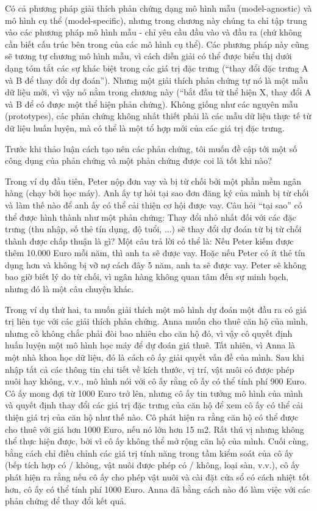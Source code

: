 Có cả phương pháp giải thích phản chứng dạng mô hình mẫu (model-agnostic) và mô hình cụ thể (model-specific), nhưng trong chương này chúng ta chỉ tập trung vào các phương pháp mô hình mẫu - chỉ yêu cầu đầu vào và đầu ra (chứ không cần biết cấu trúc bên trong của các mô hình cụ thể). Các phương pháp này cũng sẽ tương tự chương mô hình mẫu, vì cách diễn giải có thể được biểu thị dưới dạng tóm tắt các sự khác biệt trong các giá trị đặc trưng (``thay đổi đặc trưng A và B để thay đổi dự đoán''). Nhưng một giải thích phản chứng tự nó là một mẫu dữ liệu mới, vì vậy nó nằm trong chương này (``bắt đầu từ thể hiện X, thay đổi A và B để có được một thể hiện phản chứng). Không giống như các nguyên mẫu (prototypes), các phản chứng không nhất thiết phải là các mẫu dữ liệu thực tế từ dữ liệu huấn luyện, mà có thể là một tổ hợp mới của các giá trị đặc trưng.

Trước khi thảo luận cách tạo nên các phản chứng, tôi muốn đề cập tới một số công dụng của phản chứng và một phản chứng được coi là tốt khi nào?

Trong ví dụ đầu tiên, Peter nộp đơn vay và bị từ chối bởi một phần mềm ngân hàng (chạy bởi học máy). Anh ấy tự hỏi tại sao đơn đăng ký của mình bị từ chối và làm thế nào để anh ấy có thể cải thiện cơ hội được vay. Câu hỏi ``tại sao'' có thể được hình thành như một phản chứng: Thay đổi nhỏ nhất đối với các đặc trưng (thu nhập, số thẻ tín dụng, độ tuổi, ...) sẽ thay đổi dự đoán từ bị từ chối thành được chấp thuận là gì? Một câu trả lời có thể là: Nếu Peter kiếm được thêm 10.000 Euro mỗi năm, thì anh ta sẽ được vay. Hoặc nếu Peter có ít thẻ tín dụng hơn và không bị vỡ nợ cách đây 5 năm, anh ta sẽ được vay. Peter sẽ không bao giờ biết lý do từ chối, vì ngân hàng không quan tâm đến sự minh bạch, nhưng đó là một câu chuyện khác.

Trong ví dụ thứ hai, ta muốn giải thích một mô hình dự đoán một đầu ra có giá trị liên tục với các giải thích phản chứng. Anna muốn cho thuê căn hộ của mình, nhưng cô không chắc phải đòi bao nhiêu cho căn hộ đó, vì vậy cô quyết định huấn luyện một mô hình học máy để dự đoán giá thuê. Tất nhiên, vì Anna là một nhà khoa học dữ liệu, đó là cách cô ấy giải quyết vấn đề của mình. Sau khi nhập tất cả các thông tin chi tiết về kích thước, vị trí, vật nuôi có được phép nuôi hay không, v.v., mô hình nói với cô ấy rằng cô ấy có thể tính phí 900 Euro. Cô ấy mong đợi từ 1000 Euro trở lên, nhưng cô ấy tin tưởng mô hình của mình và quyết định thay đổi các giá trị đặc trưng của căn hộ để xem cô ấy có thể cải thiện giá trị của căn hộ như thế nào. Cô phát hiện ra rằng căn hộ có thể được cho thuê với giá hơn 1000 Euro, nếu nó lớn hơn 15 m2. Rất thú vị nhưng không thể thực hiện được, bởi vì cô ấy không thể mở rộng căn hộ của mình. Cuối cùng, bằng cách chỉ điều chỉnh các giá trị tính năng trong tầm kiểm soát của cô ấy (bếp tích hợp có / không, vật nuôi được phép có / không, loại sàn, v.v.), cô ấy phát hiện ra rằng nếu cô ấy cho phép vật nuôi và cài đặt cửa sổ có cách nhiệt tốt hơn, cô ấy có thể tính phí 1000 Euro. Anna đã bằng cách nào đó làm việc với các phản chứng để thay đổi kết quả.


